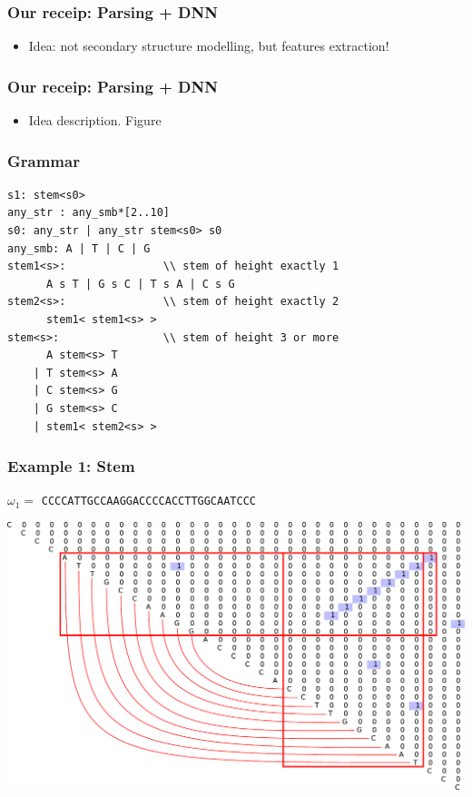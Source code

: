 \documentclass[xcolor=table]{beamer}
\begin{document}
\begin{frame}
  \transwipe[direction=90]
  \frametitle{Our receip: Parsing + DNN}

\begin{itemize}
  \item Idea: not secondary structure modelling, but features extraction!
\end{itemize}

\end{frame}


\begin{frame}
  \transwipe[direction=90]
  \frametitle{Our receip: Parsing + DNN}

\begin{itemize}
  \item Idea description. Figure
\end{itemize}

\end{frame}

\begin{frame}[fragile]
  \transwipe[direction=90]
  \frametitle{Grammar}
\begin{verbatim}
s1: stem<s0>
any_str : any_smb*[2..10]
s0: any_str | any_str stem<s0> s0
any_smb: A | T | C | G
stem1<s>:               \\ stem of height exactly 1
      A s T | G s C | T s A | C s G
stem2<s>:               \\ stem of height exactly 2
      stem1< stem1<s> >
stem<s>:                \\ stem of height 3 or more
      A stem<s> T
    | T stem<s> A
    | C stem<s> G
    | G stem<s> C
    | stem1< stem2<s> >
\end{verbatim}

\end{frame}

\begin{frame}[fragile]
  \transwipe[direction=90]
  \frametitle{Example 1: Stem}
\centering
 $\omega_1=$ \texttt{CCCCATTGCCAAGGACCCCACCTTGGCAATCCC}
\vspace{1cm}

\includegraphics[width=.8\textwidth]{pictures/4.pdf}

\end{frame}
\end{document}
